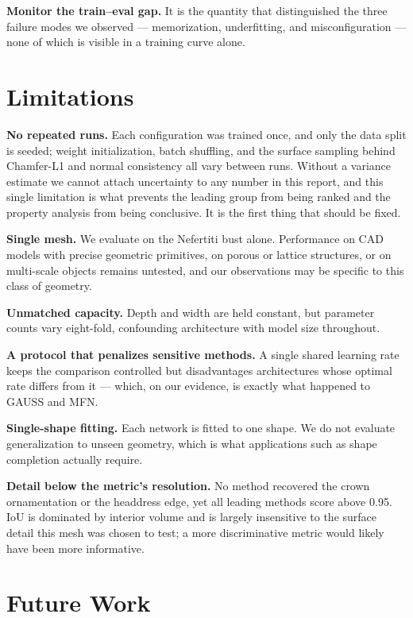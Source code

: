 \textbf{Monitor the train--eval gap.} It is the quantity that distinguished the three failure modes we observed --- memorization, underfitting, and misconfiguration --- none of which is visible in a training curve alone.

\section{Limitations}

\textbf{No repeated runs.} Each configuration was trained once, and only the data split is seeded; weight initialization, batch shuffling, and the surface sampling behind Chamfer-L1 and normal consistency all vary between runs. Without a variance estimate we cannot attach uncertainty to any number in this report, and this single limitation is what prevents the leading group from being ranked and the property analysis from being conclusive. It is the first thing that should be fixed.

\textbf{Single mesh.} We evaluate on the Nefertiti bust alone. Performance on CAD models with precise geometric primitives, on porous or lattice structures, or on multi-scale objects remains untested, and our observations may be specific to this class of geometry.

\textbf{Unmatched capacity.} Depth and width are held constant, but parameter counts vary eight-fold, confounding architecture with model size throughout.

\textbf{A protocol that penalizes sensitive methods.} A single shared learning rate keeps the comparison controlled but disadvantages architectures whose optimal rate differs from it --- which, on our evidence, is exactly what happened to GAUSS and MFN.

\textbf{Single-shape fitting.} Each network is fitted to one shape. We do not evaluate generalization to unseen geometry, which is what applications such as shape completion actually require.

\textbf{Detail below the metric's resolution.} No method recovered the crown ornamentation or the headdress edge, yet all leading methods score above 0.95. IoU is dominated by interior volume and is largely insensitive to the surface detail this mesh was chosen to test; a more discriminative metric would likely have been more informative.

\section{Future Work}

